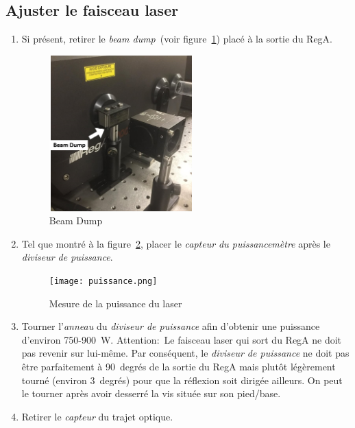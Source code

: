 \subsection{Ajuster le faisceau laser}
\begin{enumerate}
   \item Si présent, retirer le \textit{beam dump}~(voir figure~\ref{fig:beam-dump}) placé à la sortie du RegA.
        \begin{figure}[H]
        \centering
        \includegraphics[height=6cm]{beam-dump.png}
        \caption{Beam Dump}
        \label{fig:beam-dump}
        \end{figure}
    \item Tel que montré à la figure~\ref{fig:puissance}, placer le \textit{capteur du puissancemètre} après le \textit{diviseur de puissance}.
        \begin{figure}[H]
        \centering
        \texttt{[image: puissance.png]}
        \caption{Mesure de la puissance du laser}
        \label{fig:puissance}
        \end{figure}
    \item Tourner l'\textit{anneau} du \textit{diviseur de puissance} afin d'obtenir une puissance d'environ 750-900~W. Attention:~Le faisceau laser qui sort du RegA ne doit pas revenir sur lui-même. Par conséquent, le \textit{diviseur de puissance} ne doit pas être parfaitement à 90~degrés de la sortie du RegA mais plutôt légèrement tourné (environ 3~degrés) pour que la réflexion soit dirigée ailleurs. On peut le tourner après avoir desserré la vis située sur son pied/base.
    \item Retirer le \textit{capteur} du trajet optique.
        \begin{figure}[H]
        \centering

\end{figure}
\end{enumerate}
